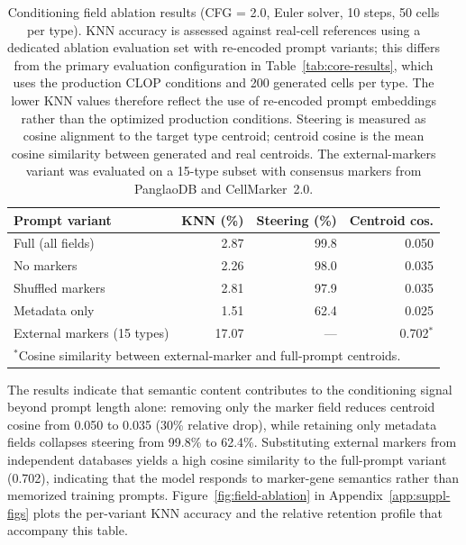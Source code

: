 \documentclass[11pt,a4paper]{article}
\begin{document}
\begin{table}[!htbp]
\centering
\caption{Conditioning field ablation results (CFG = 2.0, Euler solver, 10 steps, 50 cells per type). KNN accuracy is assessed against real-cell references using a dedicated ablation evaluation set with re-encoded prompt variants; this differs from the primary evaluation configuration in Table~\ref{tab:core-results}, which uses the production CLOP conditions and 200 generated cells per type. The lower KNN values therefore reflect the use of re-encoded prompt embeddings rather than the optimized production conditions. Steering is measured as cosine alignment to the target type centroid; centroid cosine is the mean cosine similarity between generated and real centroids. The external-markers variant was evaluated on a 15-type subset with consensus markers from PanglaoDB and CellMarker~2.0.\label{tab:cond-ablation}}
\begin{tabular}{lrrr}
\toprule
Prompt variant & KNN (\%) & Steering (\%) & Centroid cos. \\
\midrule
Full (all fields) & 2.87 & 99.8 & 0.050 \\
No markers & 2.26 & 98.0 & 0.035 \\
Shuffled markers & 2.81 & 97.9 & 0.035 \\
Metadata only & 1.51 & 62.4 & 0.025 \\
External markers (15 types) & 17.07 & --- & 0.702$^*$ \\
\bottomrule
\multicolumn{4}{l}{\footnotesize $^*$Cosine similarity between external-marker and full-prompt centroids.}
\end{tabular}
\end{table}

The results indicate that semantic content contributes to the conditioning signal beyond prompt length alone: removing only the marker field reduces centroid cosine from 0.050 to 0.035 (30\% relative drop), while retaining only metadata fields collapses steering from 99.8\% to 62.4\%. Substituting external markers from independent databases yields a high cosine similarity to the full-prompt variant (0.702), indicating that the model responds to marker-gene semantics rather than memorized training prompts. Figure~\ref{fig:field-ablation} in Appendix~\ref{app:suppl-figs} plots the per-variant KNN accuracy and the relative retention profile that accompany this table.
\end{document}
